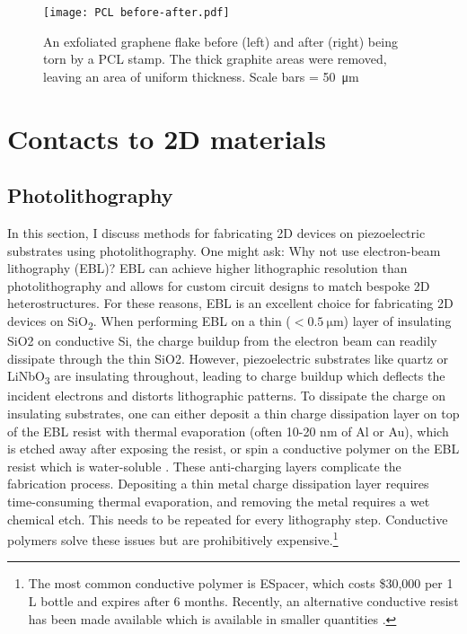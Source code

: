\documentclass[double,12pt,1in,seploa]{beavtex}
\let\Oldsection\section
\renewcommand{\section}{\FloatBarrier\Oldsection}
\let\Oldsubsection\subsection
\renewcommand{\subsection}{\FloatBarrier\Oldsubsection}
\begin{document}
\begin{figure}
    \texttt{[image: PCL before-after.pdf]}
    \caption{An exfoliated graphene flake before (left) and after (right) being torn by a PCL stamp. The thick graphite areas were removed, leaving an area of uniform thickness. Scale bars = \SI{50}{\micro\meter}}
\end{figure}





\section{Contacts to 2D materials} \label{contacts to 2D materials}

\subsection{Photolithography} \label{photolithography}

In this section, I discuss methods for fabricating 2D devices on piezoelectric substrates using photolithography. One might ask: Why not use electron-beam lithography (EBL)? EBL can achieve higher lithographic resolution than photolithography and allows for custom circuit designs to match bespoke 2D heterostructures. For these reasons, EBL is an excellent choice for fabricating 2D devices on SiO\textsubscript{2}. When performing EBL on a thin ($< \SI{0.5}{\micro\meter}$) layer of insulating SiO2 on conductive Si, the charge buildup from the electron beam can readily dissipate through the thin SiO2. However, piezoelectric substrates like quartz or LiNbO\textsubscript{3} are insulating throughout, leading to charge buildup which deflects the incident electrons and distorts lithographic patterns. To dissipate the charge on insulating substrates, one can either deposit a thin charge dissipation layer on top of the EBL resist with thermal evaporation (often 10-20 nm of Al or Au), which is etched away after exposing the resist, or spin a conductive polymer on the EBL resist which is water-soluble \cite{noauthor_nanolithography_nodate}. These anti-charging layers complicate the fabrication process. Depositing a thin metal charge dissipation layer requires time-consuming thermal evaporation, and removing the metal requires a wet chemical etch. This needs to be repeated for every lithography step. Conductive polymers solve these issues but are prohibitively expensive.\footnote{The most common conductive polymer is ESpacer, which costs \$30,000 per 1 L bottle and expires after 6 months. Recently, an alternative conductive resist has been made available which is available in smaller quantities \cite{lopez_charge_2019}.}  
\end{document}
